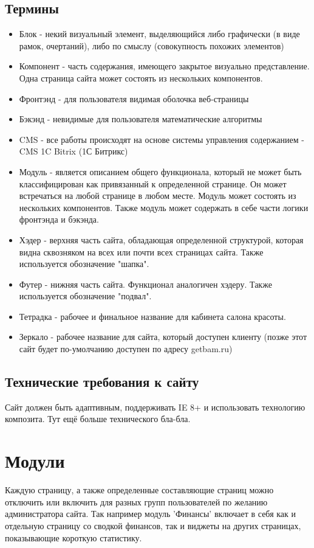 \documentclass[DIV=calc, paper=a4, fontsize=11pt]{scrartcl} %
\begin{document}
\subsection{Термины}

        \begin{itemize}
        \item Блок - некий визуальный элемент, выделяющийся либо графически (в виде рамок, очертаний), либо по смыслу (совокупность похожих элементов)
        \item Компонент - часть содержания, имеющего закрытое визуально представление. Одна страница сайта может состоять из нескольких компонентов.
        \item Фронтэнд - для пользователя видимая оболочка веб-страницы
        \item Бэкэнд - невидимые для пользователя математические алгоритмы
        \item CMS - все работы происходят на основе системы управления содержанием - CMS 1C Bitrix (1С Битрикс)
        \item Модуль - является описанием общего функционала, который не может быть классифицирован как привязанный к определенной странице. Он может встречаться на любой странице в любом месте. Модуль может состоять из нескольких компонентов. Также модуль может содержать в себе части логики фронтэнда и бэкэнда.
        \item Хэдер - верхняя часть сайта, обладающая определенной структурой, которая видна сквозняком на всех или почти всех страницах сайта. Также используется обозначение "шапка".
        \item Футер - нижняя часть сайта. Функционал аналогичен хэдеру. Также используется обозначение "подвал".
        \item Тетрадка - рабочее и финальное название для кабинета салона красоты.
        \item Зеркало - рабочее название для сайта, который доступен клиенту (позже этот сайт будет по-умолчанию доступен по адресу getbam.ru)
    \end{itemize}


\subsection{Технические требования к сайту}
Сайт должен быть адаптивным, поддерживать IE 8+ и использовать технологию композита.
Тут ещё больше технического бла-бла.


\section{Модули}
Каждую страницу, а также определенные составляющие страниц можно отключить или включить для разных групп пользователей по желанию администратора сайта. Так например модуль 'Финансы' включает в себя как и отдельную страницу со сводкой финансов, так и виджеты на других страницах, показывающие короткую статистику.
\end{document}
